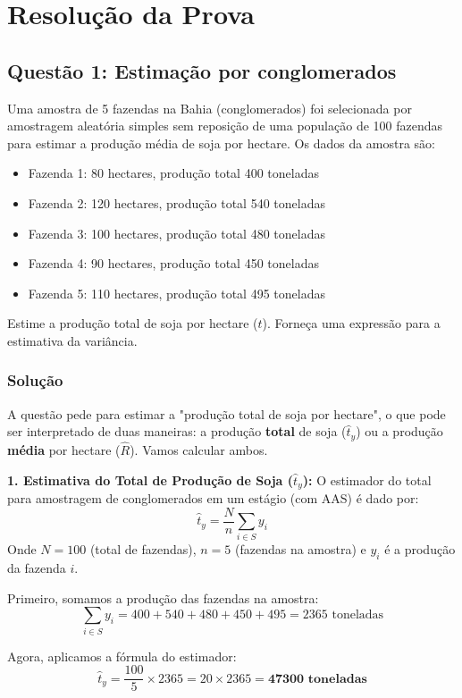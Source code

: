 \documentclass{article}
\begin{document}
\section*{Resolução da Prova}

\hrulefill
\subsection*{Questão 1: Estimação por conglomerados}
Uma amostra de 5 fazendas na Bahia (conglomerados) foi selecionada por amostragem aleatória simples sem reposição de uma população de 100 fazendas para estimar a produção média de soja por hectare. Os dados da amostra são:
\begin{itemize}
    \item Fazenda 1: 80 hectares, produção total 400 toneladas
    \item Fazenda 2: 120 hectares, produção total 540 toneladas
    \item Fazenda 3: 100 hectares, produção total 480 toneladas
    \item Fazenda 4: 90 hectares, produção total 450 toneladas
    \item Fazenda 5: 110 hectares, produção total 495 toneladas
\end{itemize}
Estime a produção total de soja por hectare ($\hat{t}$). Forneça uma expressão para a estimativa da variância.

\subsubsection*{Solução}
A questão pede para estimar a "produção total de soja por hectare", o que pode ser interpretado de duas maneiras: a produção \textbf{total} de soja ($\hat{t}_y$) ou a produção \textbf{média} por hectare ($\hat{R}$). Vamos calcular ambos.

\textbf{1. Estimativa do Total de Produção de Soja ($\hat{t}_y$):}
O estimador do total para amostragem de conglomerados em um estágio (com AAS) é dado por:
\[ \hat{t}_y = \frac{N}{n} \sum_{i \in S} y_i \]
Onde $N=100$ (total de fazendas), $n=5$ (fazendas na amostra) e $y_i$ é a produção da fazenda $i$.

Primeiro, somamos a produção das fazendas na amostra:
\[ \sum_{i \in S} y_i = 400 + 540 + 480 + 450 + 495 = 2365 \text{ toneladas} \]

Agora, aplicamos a fórmula do estimador:
\[ \hat{t}_y = \frac{100}{5} \times 2365 = 20 \times 2365 = \mathbf{47300 \textbf{ toneladas}} \]
\end{document}

